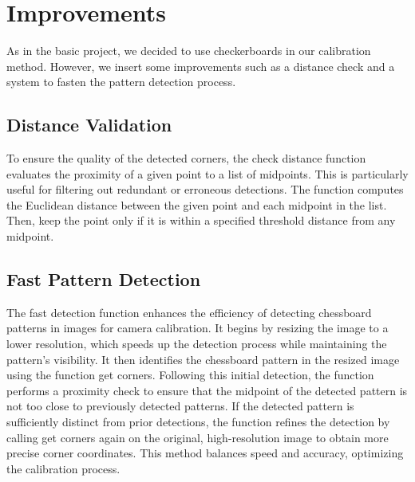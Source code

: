 \documentclass{template}
\begin{document}
\section{Improvements}

As in the basic project, we decided to use checkerboards in our calibration method. However, we insert some improvements such as a distance check and a system to fasten the pattern detection process.

\subsection{Distance Validation}
To ensure the quality of the detected corners, the check distance function evaluates the proximity of a given point to a list of midpoints. This is particularly useful for filtering out redundant or erroneous detections. 
The function computes the Euclidean distance between the given point and each midpoint in the list. Then, keep the point only if it is within a specified threshold distance from any midpoint.

\subsection{Fast Pattern Detection}
The fast detection function enhances the efficiency of detecting chessboard patterns in images for camera calibration. It begins by resizing the image to a lower resolution, which speeds up the detection process while maintaining the pattern’s visibility. It then identifies the chessboard pattern in the resized image using the function get corners. Following this initial detection, the function performs a proximity check to ensure that the midpoint of the detected pattern is not too close to previously detected patterns. If the detected pattern is sufficiently distinct from prior detections, the function refines the detection by calling get corners again on the original, high-resolution image to obtain more precise corner coordinates. This method balances speed and accuracy, optimizing the calibration process.
\end{document}
